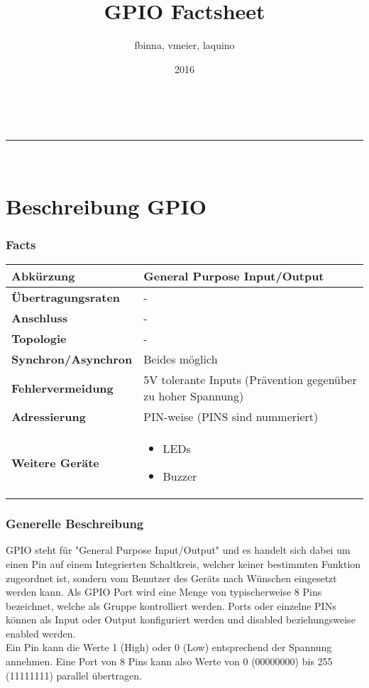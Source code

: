 \documentclass[a4paper,11pt]{article}
\makeatletter
\newcommand{\linia}{\rule{\linewidth}{0.5pt}}
\renewcommand{\maketitle}{
\begin{center}
\vspace{2ex}
{\huge \textsc{\@title}}
\vspace{1ex}
\\
\linia\\
\@author \hfill \@date
\vspace{4ex}
\end{center}
}
\makeatother
\begin{document}
\title{GPIO Factsheet}

\author{fbinna, vmeier, laquino}

\date{2016}

\maketitle
\part{Beschreibung GPIO}
\section*{Facts}
\begin{tabular}{| p{3.5cm} | p{10cm} |}
	\hline
	\textbf{Abkürzung} & General Purpose Input/Output\\\hline
	\textbf{Übertragungsraten} & -\\\hline
	\textbf{Anschluss} & -\\\hline
	\textbf{Topologie} & -\\\hline
	\textbf{Synchron/Asynchron} & Beides möglich\\\hline
	\textbf{Fehlervermeidung} & 5V tolerante Inputs (Prävention gegenüber zu hoher Spannung)\\\hline
	\textbf{Adressierung} & PIN-weise (PINS sind nummeriert)\\\hline
	\textbf{Weitere Geräte} & 
	\begin{itemize}
		\item LEDs
		\item Buzzer
	\end{itemize}
	\\\hline
\end{tabular}
\section{Generelle Beschreibung}
GPIO steht für "General Purpose Input/Output" und es handelt sich dabei um einen Pin auf einem Integrierten Schaltkreis, welcher keiner bestimmten Funktion zugeordnet ist, sondern vom Benutzer des Geräts nach Wünschen eingesetzt werden kann. Als GPIO Port wird eine Menge von typischerweise 8 Pins bezeichnet, welche als Gruppe kontrolliert werden. Ports oder einzelne PINs können als Input oder Output konfiguriert werden und disabled beziehungsweise enabled werden. \\
Ein Pin kann die Werte 1 (High) oder 0 (Low) entsprechend der Spannung annehmen. Eine Port von 8 Pins kann also Werte von 0 (00000000) bis 255 (11111111) parallel übertragen.
	
\end{document}
